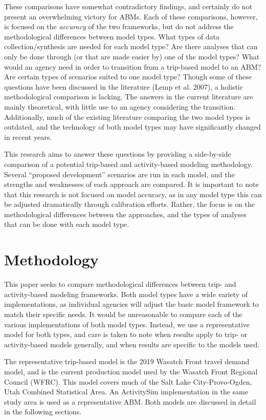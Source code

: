 \documentclass[fancy, oneside, mastersfancy, ms]{byuthesis}
\begin{document}
These comparisons have somewhat contradictory findings, and certainly do
not present an overwhelming victory for ABMs. Each of these comparisons,
however, is focused on the \emph{accuracy} of the two frameworks, but do
not address the methodological differences between model types. What
types of data collection/synthesis are needed for each model type? Are
there analyses that can only be done through (or that are made easier
by) one of the model types? What would an agency need in order to
transition from a trip-based model to an ABM? Are certain types of
scenarios suited to one model type? Though some of these questions have
been discussed in the literature (Lemp et al. 2007), a holistic
methodological comparison is lacking. The answers in the current
literature are mainly theoretical, with little use to an agency
considering the transition. Additionally, much of the existing
literature comparing the two model types is outdated, and the technology
of both model types may have significantly changed in recent years.

This research aims to answer these questions by providing a side-by-side
comparison of a potential trip-based and activity-based modeling
methodology. Several ``proposed development'' scenarios are run in each
model, and the strengths and weaknesses of each approach are compared.
It is important to note that this research is not focused on model
accuracy, as in any model type this can be adjusted dramatically through
calibration efforts. Rather, the focus is on the methodological
differences between the approaches, and the types of analyses that can
be done with each model type.


\chapter{Methodology}\label{sec-methods}

This paper seeks to compare methodological differences between trip- and
activity-based modeling frameworks. Both model types have a wide variety
of implementations, as individual agencies will adjust the basic model
framework to match their specific needs. It would be unreasonable to
compare each of the various implementations of both model types.
Instead, we use a representative model for both types, and care is taken
to note when results apply to trip- or activity-based models generally,
and when results are specific to the models used.

The representative trip-based model is the 2019 Wasatch Front travel
demand model, and is the current production model used by the Wasatch
Front Regional Council (WFRC). This model covers much of the Salt Lake
City-Provo-Ogden, Utah Combined Statistical Area. An ActivitySim
implementation in the same study area is used as a representative ABM.
Both models are discussed in detail in the following sections.
\end{document}
